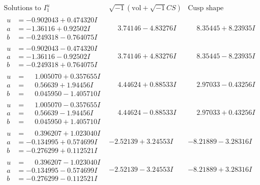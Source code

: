 \documentclass[1p]{elsarticle_modified}
\theoremstyle{definition}
\newcommand{\I}{\sqrt{-1}}
\begin{document}
$$\begin{array}{c|c|c}  
\text{Solutions to }I^u_{1}& \I (\text{vol} + \sqrt{-1}CS) & \text{Cusp shape}\\
 \hline 
\begin{aligned}
u &= -0.902043 + 0.474320 I \\
a &= -1.36116 + 0.92502 I \\
b &= -0.249318 - 0.764075 I\end{aligned}
 & \phantom{-}3.74146 - 4.83276 I & \phantom{-}8.35445 + 8.23935 I \\ \hline\begin{aligned}
u &= -0.902043 - 0.474320 I \\
a &= -1.36116 - 0.92502 I \\
b &= -0.249318 + 0.764075 I\end{aligned}
 & \phantom{-}3.74146 + 4.83276 I & \phantom{-}8.35445 - 8.23935 I \\ \hline\begin{aligned}
u &= \phantom{-}1.005070 + 0.357655 I \\
a &= \phantom{-}0.56639 + 1.94456 I \\
b &= \phantom{-}0.045950 - 1.405710 I\end{aligned}
 & \phantom{-}4.44624 + 0.88533 I & \phantom{-}2.97033 - 0.43256 I \\ \hline\begin{aligned}
u &= \phantom{-}1.005070 - 0.357655 I \\
a &= \phantom{-}0.56639 - 1.94456 I \\
b &= \phantom{-}0.045950 + 1.405710 I\end{aligned}
 & \phantom{-}4.44624 - 0.88533 I & \phantom{-}2.97033 + 0.43256 I \\ \hline\begin{aligned}
u &= \phantom{-}0.396207 + 1.023040 I \\
a &= -0.134995 + 0.574699 I \\
b &= -0.276299 + 0.112521 I\end{aligned}
 & -2.52139 + 3.24553 I & -8.21889 - 3.28316 I \\ \hline\begin{aligned}
u &= \phantom{-}0.396207 - 1.023040 I \\
a &= -0.134995 - 0.574699 I \\
b &= -0.276299 - 0.112521 I\end{aligned}
 & -2.52139 - 3.24553 I & -8.21889 + 3.28316 I \\ \hline\begin{aligned}

\end{aligned}
\end{array}$$
\end{document}
